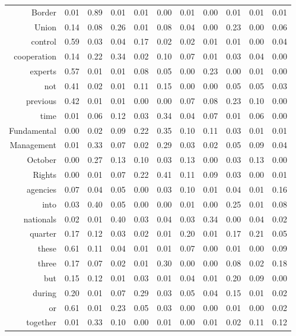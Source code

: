 \begin{longtable}{rrrrrrrrrrr}
  Border & 0.01 & 0.89 & 0.01 & 0.01 & 0.00 & 0.01 & 0.00 & 0.01 & 0.01 & 0.01 \\ 
  Union & 0.14 & 0.08 & 0.26 & 0.01 & 0.08 & 0.04 & 0.00 & 0.23 & 0.00 & 0.06 \\ 
  control & 0.59 & 0.03 & 0.04 & 0.17 & 0.02 & 0.02 & 0.01 & 0.01 & 0.00 & 0.04 \\ 
  cooperation & 0.14 & 0.22 & 0.34 & 0.02 & 0.10 & 0.07 & 0.01 & 0.03 & 0.04 & 0.00 \\ 
  experts & 0.57 & 0.01 & 0.01 & 0.08 & 0.05 & 0.00 & 0.23 & 0.00 & 0.01 & 0.00 \\ 
  not & 0.41 & 0.02 & 0.01 & 0.11 & 0.15 & 0.00 & 0.00 & 0.05 & 0.05 & 0.03 \\ 
  previous & 0.42 & 0.01 & 0.01 & 0.00 & 0.00 & 0.07 & 0.08 & 0.23 & 0.10 & 0.00 \\ 
  time & 0.01 & 0.06 & 0.12 & 0.03 & 0.34 & 0.04 & 0.07 & 0.01 & 0.06 & 0.00 \\ 
  Fundamental & 0.00 & 0.02 & 0.09 & 0.22 & 0.35 & 0.10 & 0.11 & 0.03 & 0.01 & 0.01 \\ 
  Management & 0.01 & 0.33 & 0.07 & 0.02 & 0.29 & 0.03 & 0.02 & 0.05 & 0.09 & 0.04 \\ 
  October & 0.00 & 0.27 & 0.13 & 0.10 & 0.03 & 0.13 & 0.00 & 0.03 & 0.13 & 0.00 \\ 
  Rights & 0.00 & 0.01 & 0.07 & 0.22 & 0.41 & 0.11 & 0.09 & 0.03 & 0.00 & 0.01 \\ 
  agencies & 0.07 & 0.04 & 0.05 & 0.00 & 0.03 & 0.10 & 0.01 & 0.04 & 0.01 & 0.16 \\ 
  into & 0.03 & 0.40 & 0.05 & 0.00 & 0.00 & 0.01 & 0.00 & 0.25 & 0.01 & 0.08 \\ 
  nationals & 0.02 & 0.01 & 0.40 & 0.03 & 0.04 & 0.03 & 0.34 & 0.00 & 0.04 & 0.02 \\ 
  quarter & 0.17 & 0.12 & 0.03 & 0.02 & 0.01 & 0.20 & 0.01 & 0.17 & 0.21 & 0.05 \\ 
  these & 0.61 & 0.11 & 0.04 & 0.01 & 0.01 & 0.07 & 0.00 & 0.01 & 0.00 & 0.09 \\ 
  three & 0.17 & 0.07 & 0.02 & 0.01 & 0.30 & 0.00 & 0.00 & 0.08 & 0.02 & 0.18 \\ 
  but & 0.15 & 0.12 & 0.01 & 0.03 & 0.01 & 0.04 & 0.01 & 0.20 & 0.09 & 0.00 \\ 
  during & 0.20 & 0.01 & 0.07 & 0.29 & 0.03 & 0.05 & 0.04 & 0.15 & 0.01 & 0.02 \\ 
  or & 0.61 & 0.01 & 0.23 & 0.05 & 0.03 & 0.00 & 0.00 & 0.01 & 0.00 & 0.02 \\ 
  together & 0.01 & 0.33 & 0.10 & 0.00 & 0.01 & 0.00 & 0.01 & 0.02 & 0.11 & 0.12 \\ 

\end{longtable}
